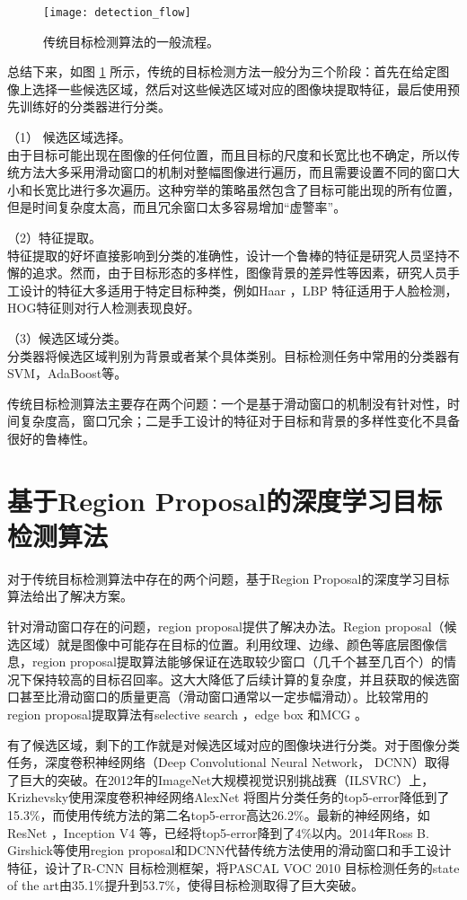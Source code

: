 \begin{figure}[!t]
	\centering
	\texttt{[image: detection\_flow]}
	\caption{传统目标检测算法的一般流程。}
	\label{detection_flow}
\end{figure}

总结下来，如图 \ref{detection_flow} 所示，传统的目标检测方法一般分为三个阶段：首先在给定图像上选择一些候选区域，然后对这些候选区域对应的图像块提取特征，最后使用预先训练好的分类器进行分类。
\begin{namelist}{}
	\item （1） 候选区域选择。\\
	由于目标可能出现在图像的任何位置，而且目标的尺度和长宽比也不确定，所以传统方法大多采用滑动窗口的机制对整幅图像进行遍历，而且需要设置不同的窗口大小和长宽比进行多次遍历。这种穷举的策略虽然包含了目标可能出现的所有位置，但是时间复杂度太高，而且冗余窗口太多容易增加``虚警率''。
	\item （2）特征提取。\\
	特征提取的好坏直接影响到分类的准确性，设计一个鲁棒的特征是研究人员坚持不懈的追求。然而，由于目标形态的多样性，图像背景的差异性等因素，研究人员手工设计的特征大多适用于特定目标种类，例如Haar \cite{via-jones-face}，LBP \cite{lbp} 特征适用于人脸检测，HOG特征则对行人检测表现良好。
	\item （3）候选区域分类。\\
	分类器将候选区域判别为背景或者某个具体类别。目标检测任务中常用的分类器有SVM，AdaBoost等。
\end{namelist}
传统目标检测算法主要存在两个问题：一个是基于滑动窗口的机制没有针对性，时间复杂度高，窗口冗余；二是手工设计的特征对于目标和背景的多样性变化不具备很好的鲁棒性。

\section{基于Region Proposal的深度学习目标检测算法}
对于传统目标检测算法中存在的两个问题，基于Region Proposal的深度学习目标算法给出了解决方案。

针对滑动窗口存在的问题，region proposal提供了解决办法。Region proposal（候选区域）就是图像中可能存在目标的位置。利用纹理、边缘、颜色等底层图像信息，region proposal提取算法能够保证在选取较少窗口（几千个甚至几百个）的情况下保持较高的目标召回率。这大大降低了后续计算的复杂度，并且获取的候选窗口甚至比滑动窗口的质量更高（滑动窗口通常以一定歩幅滑动）。比较常用的region proposal提取算法有selective search \cite{selective-search}，edge box \cite{edge-box}和MCG \cite{mcg}。

有了候选区域，剩下的工作就是对候选区域对应的图像块进行分类。对于图像分类任务，深度卷积神经网络（Deep Convolutional Neural Network， DCNN）取得了巨大的突破。在2012年的ImageNet大规模视觉识别挑战赛（ILSVRC）上，Krizhevsky使用深度卷积神经网络AlexNet \cite{alexnet}将图片分类任务的top5-error降低到了15.3\%，而使用传统方法的第二名top5-error高达26.2\%。最新的神经网络，如ResNet \cite{resnet}，Inception V4 \cite{inception-v4}等，已经将top5-error降到了4\%以内。2014年Ross B. Girshick等使用region proposal和DCNN代替传统方法使用的滑动窗口和手工设计特征，设计了R-CNN \cite{rcnn}目标检测框架，将PASCAL VOC 2010 \cite{pascal-voc-2010} 目标检测任务的state of the art由35.1\%提升到53.7\%，使得目标检测取得了巨大突破。

